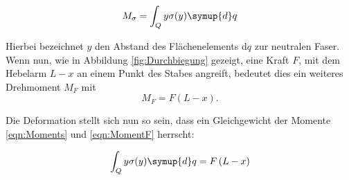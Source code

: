 \begin{equation}
\label{eqn:Moments}
    M_\sigma = \int_Q y\sigma(y)\symup{d}q 
\end{equation}

\noindent Hierbei bezeichnet $y$ den Abstand des Flächenelements d$q$ zur neutralen Faser.\\
Wenn nun, wie in Abbildung \ref{fig:Durchbiegung} gezeigt, eine Kraft $F$, mit dem Hebelarm $L-x$ an einem Punkt des Stabes angreift, bedeutet dies
ein weiteres Drehmoment $M_F$ mit
\begin{equation}
\label{eqn:MomentF}
    M_F = F\left(L-x\right).
\end{equation}

\noindent Die Deformation stellt sich nun so sein, dass ein Gleichgewicht der Momente \eqref{eqn:Moments} und \eqref{eqn:MomentF} herrscht:

\begin{equation}
    \int_Q y\sigma(y)\symup{d}q =F\left(L-x\right)
\end{equation}



